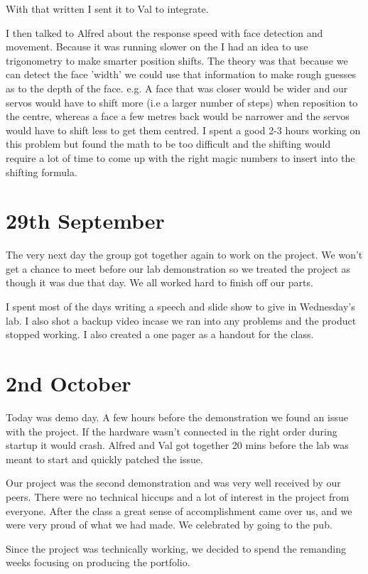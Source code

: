 With that written I sent it to Val to integrate.

I then talked to Alfred about the response speed with face detection and movement. Because it was running slower on the \rpi \xspace I had an idea to use trigonometry to make smarter position shifts. The theory was that because we can detect the face 'width' we could use that information to make rough guesses as to the depth of the face. e.g. A face that was closer would be wider and our servos would have to shift more (i.e a larger number of steps) when reposition to the centre, whereas a face a few metres back would be narrower and the servos would have to shift less to get them centred. I spent a good 2-3 hours working on this problem but found the math to be too difficult and the shifting would require a lot of time to come up with the right magic numbers to insert into the shifting formula.


\section*{29th September}

The very next day the group got together again to work on the project. We won't get a chance to meet before our lab demonstration so we treated the project as though it was due that day. We all worked hard to finish off our parts. 

I spent most of the days writing a speech and slide show to give in Wednesday's lab. I also shot a backup video incase we ran into any problems and the product stopped working. I also created a one pager as a handout for the class.

\section*{2nd October}

Today was demo day. A few hours before the demonstration we found an issue with the project. If the hardware wasn't connected in the right order during startup it would crash. Alfred and Val got together 20 mins before the lab was meant to start and quickly patched the issue. 

Our project was the second demonstration and was very well received by our peers. There were no technical hiccups and a lot of interest in the project from everyone. After the class a great sense of accomplishment came over us, and we were very proud of what we had made. We celebrated by going to the pub.

Since the project was technically working, we decided to spend the remanding weeks focusing on producing the portfolio.
